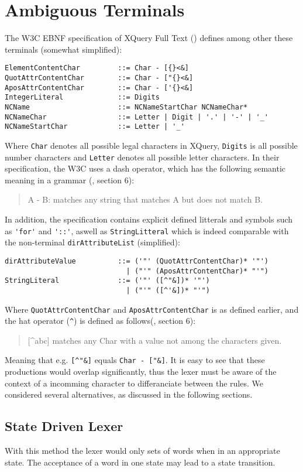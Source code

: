 \section{Ambiguous Terminals}
The W3C EBNF specification of XQuery Full Text (\cite{w3c01}) defines among other these terminals (somewhat simplified):
\begin{verbatim}
ElementContentChar         ::= Char - [{}<&]
QuotAttrContentChar        ::= Char - ["{}<&]
AposAttrContentChar        ::= Char - ['{}<&]
IntegerLiteral             ::= Digits
NCName                     ::= NCNameStartChar NCNameChar*
NCNameChar                 ::= Letter | Digit | '.' | '-' | '_'
NCNameStartChar            ::= Letter | '_'
\end{verbatim}
Where \verb!Char! denotes all possible legal characters in XQuery, \verb!Digits! is all possible number characters and \verb!Letter! denotes all possible letter characters. In their specification, the W3C uses a dash operator, which has the following
semantic meaning in a grammar (\cite{w3c03}, section 6):
\begin{quote}
A - B: matches any string that matches A but does not match B.
\end{quote}
In addition, the specification contains explicit defined litterals and symbols such as \verb!'for'! and \verb!'::'!, aswell as \verb!StringLitteral! which is indeed comparable with the non-terminal \verb!dirAttributeList! (simplified):
\begin{verbatim}
dirAttributeValue          ::= ('"' (QuotAttrContentChar)* '"')
                             | ("'" (AposAttrContentChar)* "'")
StringLiteral              ::= ('"' ([^"&])* '"') 
                             | ("'" ([^'&])* "'")
\end{verbatim}
Where \verb!QuotAttrContentChar! and \verb!AposAttrContentChar! is as defined earlier, and the hat operator (\verb!^!) is defined as follows(\cite{w3c03}, section 6):
\begin{quote}
[\^{}abc] matches any Char with a value not among the characters given.
\end{quote}
Meaning that e.g. \verb![^"&]! equals \verb!Char - ["&]!. It is easy to see that these productions would overlap significantly, thus the lexer must be aware of the context of a incomming character to differanciate between the rules. We considered several alternatives, as discussed in the following sections.

\subsection{State Driven Lexer}
With this method the lexer would only sets of words when in an appropriate state. The acceptance of a word in one state may lead to a state transition. 